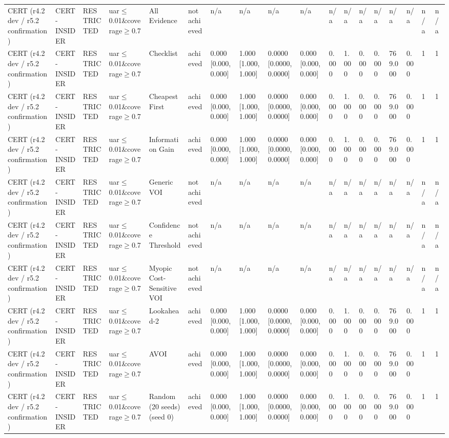 \begin{table}[!ht]
{\begin{tabular}{llllllllllllllllll}
CERT (r4.2 dev / r5.2 confirmation) & CERT-INSIDER & RESTRICTED & uar$\le$0.01\&coverage$\ge$0.7 & All Evidence & not achieved & n/a & n/a & n/a & n/a & n/a & n/a & n/a & n/a & n/a & n/a & n/a & n/a \\
CERT (r4.2 dev / r5.2 confirmation) & CERT-INSIDER & RESTRICTED & uar$\le$0.01\&coverage$\ge$0.7 & Checklist & achieved & 0.000 [0.000, 0.000] & 1.000 [1.000, 1.000] & 0.0000 [0.0000, 0.0000] & 0.000 [0.000, 0.000] & 0.000 & 1.000 & 0.000 & 0.000 & 769.000 & 0.000 & 1 & 1 \\
CERT (r4.2 dev / r5.2 confirmation) & CERT-INSIDER & RESTRICTED & uar$\le$0.01\&coverage$\ge$0.7 & Cheapest First & achieved & 0.000 [0.000, 0.000] & 1.000 [1.000, 1.000] & 0.0000 [0.0000, 0.0000] & 0.000 [0.000, 0.000] & 0.000 & 1.000 & 0.000 & 0.000 & 769.000 & 0.000 & 1 & 1 \\
CERT (r4.2 dev / r5.2 confirmation) & CERT-INSIDER & RESTRICTED & uar$\le$0.01\&coverage$\ge$0.7 & Information Gain & achieved & 0.000 [0.000, 0.000] & 1.000 [1.000, 1.000] & 0.0000 [0.0000, 0.0000] & 0.000 [0.000, 0.000] & 0.000 & 1.000 & 0.000 & 0.000 & 769.000 & 0.000 & 1 & 1 \\
CERT (r4.2 dev / r5.2 confirmation) & CERT-INSIDER & RESTRICTED & uar$\le$0.01\&coverage$\ge$0.7 & Generic VOI & not achieved & n/a & n/a & n/a & n/a & n/a & n/a & n/a & n/a & n/a & n/a & n/a & n/a \\
CERT (r4.2 dev / r5.2 confirmation) & CERT-INSIDER & RESTRICTED & uar$\le$0.01\&coverage$\ge$0.7 & Confidence Threshold & not achieved & n/a & n/a & n/a & n/a & n/a & n/a & n/a & n/a & n/a & n/a & n/a & n/a \\
CERT (r4.2 dev / r5.2 confirmation) & CERT-INSIDER & RESTRICTED & uar$\le$0.01\&coverage$\ge$0.7 & Myopic Cost-Sensitive VOI & not achieved & n/a & n/a & n/a & n/a & n/a & n/a & n/a & n/a & n/a & n/a & n/a & n/a \\
CERT (r4.2 dev / r5.2 confirmation) & CERT-INSIDER & RESTRICTED & uar$\le$0.01\&coverage$\ge$0.7 & Lookahead-2 & achieved & 0.000 [0.000, 0.000] & 1.000 [1.000, 1.000] & 0.0000 [0.0000, 0.0000] & 0.000 [0.000, 0.000] & 0.000 & 1.000 & 0.000 & 0.000 & 769.000 & 0.000 & 1 & 1 \\
CERT (r4.2 dev / r5.2 confirmation) & CERT-INSIDER & RESTRICTED & uar$\le$0.01\&coverage$\ge$0.7 & AVOI & achieved & 0.000 [0.000, 0.000] & 1.000 [1.000, 1.000] & 0.0000 [0.0000, 0.0000] & 0.000 [0.000, 0.000] & 0.000 & 1.000 & 0.000 & 0.000 & 769.000 & 0.000 & 1 & 1 \\
CERT (r4.2 dev / r5.2 confirmation) & CERT-INSIDER & RESTRICTED & uar$\le$0.01\&coverage$\ge$0.7 & Random (20 seeds) (seed 0) & achieved & 0.000 [0.000, 0.000] & 1.000 [1.000, 1.000] & 0.0000 [0.0000, 0.0000] & 0.000 [0.000, 0.000] & 0.000 & 1.000 & 0.000 & 0.000 & 769.000 & 0.000 & 1 & 1 \\

\end{tabular}}
\end{table}
